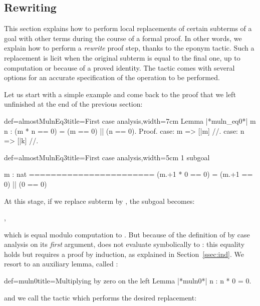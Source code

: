 
\subsection{Rewriting}\label{ssec:rw}

This section explains how to perform local replacements of certain
subterms of a goal with other terms during the course of a formal
proof. In other words, we explain how to perform a
\emph{rewrite} proof step, thanks to the eponym  tactic.
Such a replacement is licit when the original subterm is equal
to the final one, up to computation or because of a proved
identity. The  tactic comes with several options for
an accurate specification of the operation to be performed.

Let us start with a simple example and come back to the proof that we
left unfinished at the end of the previous section:

\begin{coq}{def=almostMulnEq3}{title=First case analysis,width=7cm}
Lemma |*muln_eq0*| m n :
  (m * n == 0) = (m == 0) || (n == 0).
Proof.
case: m => [|m] //.
case: n => [|k] //.
\end{coq}
\begin{coqout}{def=almostMulnEq3}{title=First case analysis,width=5cm}
1 subgoal

m : nat
=======================
(m.+1 * 0 == 0) =
(m.+1 == 0) || (0 == 0)
\end{coqout}
At this stage, if we replace subterm  by , the
subgoal becomes:

\centerline{ ,}
which is equal modulo computation to . But because of
the definition of  by case analysis on its \emph{first}
argument,  does not evaluate symbolically to : this
equality holds but requires a proof by induction, as explained in
Section~\ref{ssec:ind}.
We resort to an auxiliary lemma, called
:

\begin{coq}{def=muln0}{title=Multiplying by zero on the left}
Lemma |*muln0*| n : n * 0 = 0.
\end{coq}
and we call the  tactic which performs the desired replacement:

